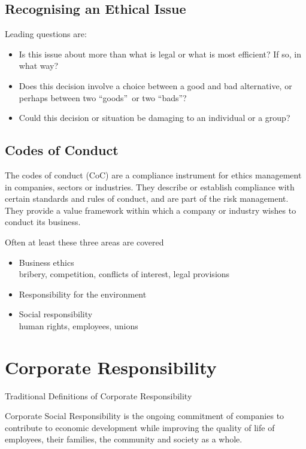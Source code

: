 \documentclass[11pt]{article}
\theoremstyle{definition}
\begin{document}
\subsection{Recognising an Ethical Issue}
Leading questions are:
\begin{itemize}
	\item Is this issue about more than what is legal or what is most efficient? If so, in what way?
	\item Does this decision involve a choice between a good and bad alternative, or perhaps between two \textquotedblleft goods\textquotedblright\ or two \textquotedblleft bads\textquotedblright?
	\item Could this decision or situation be damaging to an individual or a group?
\end{itemize}

\subsection{Codes of Conduct}
The codes of conduct (CoC) are a compliance instrument for ethics management in companies, sectors or industries. They describe or establish compliance with certain standards and rules of conduct, and are part of the risk management. They provide a value framework within which a company or industry wishes to conduct its business.

Often at least these three areas are covered
\begin{itemize}
	\item Business ethics\\
	bribery, competition, conflicts of interest, legal provisions
	\item Responsibility for the environment
	\item Social responsibility\\
	human rights, employees, unions
\end{itemize}

\section{Corporate Responsibility}
Traditional Definitions of Corporate Responsibility
\begin{definition}
	Corporate Social Responsibility is the ongoing commitment of companies to contribute to economic development while improving the quality of life of employees, their families, the community and society as a whole.
\end{definition}
\end{document}
